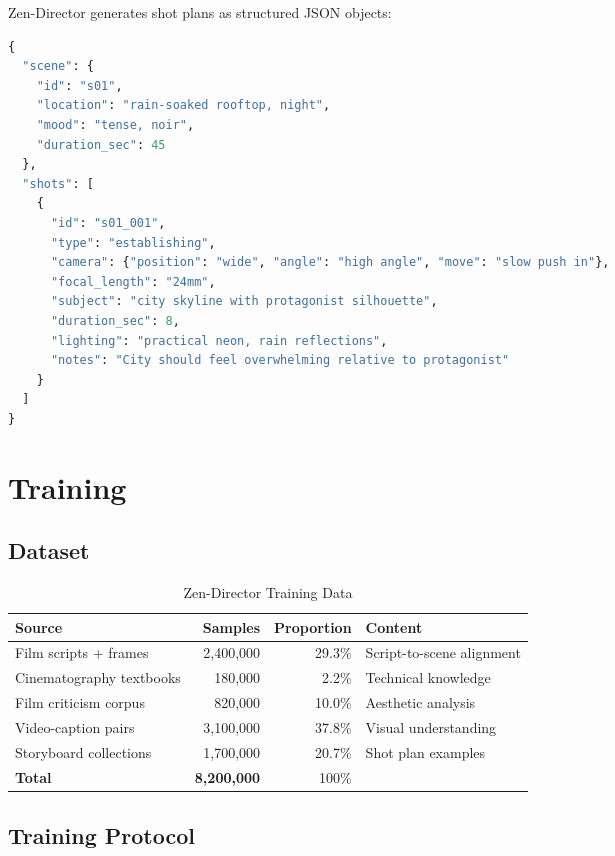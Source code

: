 \documentclass[11pt,a4paper]{article}
\begin{document}
Zen-Director generates shot plans as structured JSON objects:

\begin{lstlisting}[language=Python, caption=Shot Plan Schema]
{
  "scene": {
    "id": "s01",
    "location": "rain-soaked rooftop, night",
    "mood": "tense, noir",
    "duration_sec": 45
  },
  "shots": [
    {
      "id": "s01_001",
      "type": "establishing",
      "camera": {"position": "wide", "angle": "high angle", "move": "slow push in"},
      "focal_length": "24mm",
      "subject": "city skyline with protagonist silhouette",
      "duration_sec": 8,
      "lighting": "practical neon, rain reflections",
      "notes": "City should feel overwhelming relative to protagonist"
    }
  ]
}
\end{lstlisting}

\section{Training}

\subsection{Dataset}

\begin{table}[H]
\centering
\begin{tabular}{lrrl}
\toprule
\textbf{Source} & \textbf{Samples} & \textbf{Proportion} & \textbf{Content} \\
\midrule
Film scripts + frames & 2,400,000 & 29.3\% & Script-to-scene alignment \\
Cinematography textbooks & 180,000 & 2.2\% & Technical knowledge \\
Film criticism corpus & 820,000 & 10.0\% & Aesthetic analysis \\
Video-caption pairs & 3,100,000 & 37.8\% & Visual understanding \\
Storyboard collections & 1,700,000 & 20.7\% & Shot plan examples \\
\midrule
\textbf{Total} & \textbf{8,200,000} & 100\% & \\
\bottomrule
\end{tabular}
\caption{Zen-Director Training Data}
\end{table}

\subsection{Training Protocol}
\end{document}
